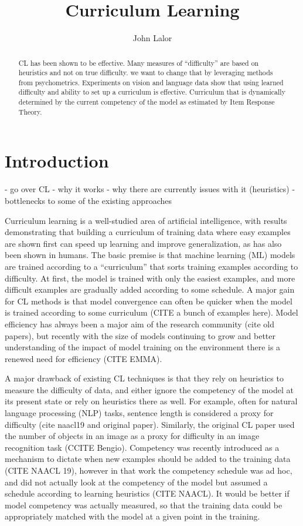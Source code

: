 \documentclass{article}
\title{Curriculum Learning}
\author{John Lalor}
\begin{document}
\maketitle 
\begin{abstract}
CL has been shown to be effective.
Many measures of ``difficulty'' are based on heuristics and not on true difficulty.
we want to change that by leveraging methods from psychometrics.
Experiments on vision and language data show that using learned difficulty and ability to set up a curriculum is effective.
Curriculum that is dynamically determined by the current competency of the model as estimated by Item Response Theory. 
\end{abstract}

\section{Introduction}
- go over CL
- why it works
- why there are currently issues with it (heuristics)
- bottlenecks to some of the existing approaches

Curriculum learning is a well-studied area of artificial intelligence, with results demonstrating that building a curriculum of training data where easy examples are shown first can speed up learning and improve generalization, as has also been shown in humans. 
The basic premise is that machine learning (ML) models are trained according to a ``curriculum'' that sorts training examples according to difficulty.
At first, the model is trained with only the easiest examples, and more difficult examples are gradually added according to some schedule.
A major gain for CL methods is that model convergence can often be quicker when the model is trained according to some curriculum (CITE a bunch of examples here).
Model efficiency has always been a major aim of the research community (cite old papers), but recently with the size of models continuing to grow and better understanding of the impact of model training on the environment there is a renewed need for efficiency (CITE EMMA).

A major drawback of existing CL techniques is that they rely on heuristics to measure the difficulty of data, and either ignore the competency of the model at its present state or rely on heuristics there as well.
For example, often for natural language processing (NLP) tasks, sentence length is considered a proxy for difficulty (cite naacl19 and original paper).
Similarly, the original CL paper used the number of objects in an image as a proxy for difficulty in an image recognition task (CCITE Bengio).
Competency was recently introduced as a mechanism to dictate when new examples should be added to the training data (CITE NAACL 19), however in that work the competency schedule was ad hoc, and did not actually look at the competency of the model but assumed a schedule according to learning heuristics (CITE NAACL). 
It would be better if model competency was actually measured, so that the training data could be appropriately matched with the model at a given point in the training.
\end{document}
